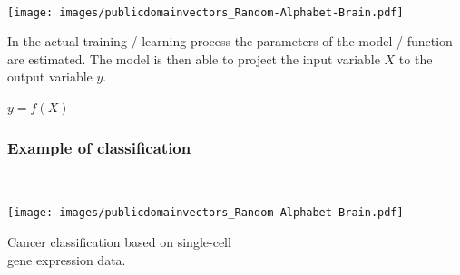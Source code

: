 \documentclass[aspectratio=169]{beamer}
\begin{document}
\begin{frame}
  \begin{block}{}
    \vspace{0.5cm}
    \ \ \ \
    \begin{minipage}{0.10\textwidth}
      \begin{center}
        \texttt{[image: images/publicdomainvectors\_Random-Alphabet-Brain.pdf]}
      \end{center}        
    \end{minipage}
    \hfill
    \begin{minipage}{0.80\textwidth}
     In the actual training / learning process the parameters of the
     model / function are estimated. The model is then able to project
     the input variable $X$ to the output variable $y$.\\
     \begin{center}
       $y = f(X)$       
     \end{center}

    \end{minipage}
    \vspace{0.3cm}
  \end{block}
\end{frame}



\begin{frame}
  \frametitle{Example of classification}
  \begin{block}{}
    \vspace{0.5cm}
    \ \ \ \
    \begin{minipage}{0.10\textwidth}
      \begin{center}
        \texttt{[image: images/publicdomainvectors\_Random-Alphabet-Brain.pdf]}
      \end{center}        
    \end{minipage}
    \hfill
    \begin{minipage}{0.80\textwidth}

     \begin{center}
       Cancer classification based on single-cell\\
       gene expression data.
     \end{center}

    \end{minipage}
    \vspace{0.3cm}
  \end{block}
\end{frame}
\end{document}
